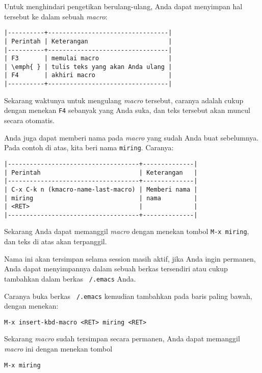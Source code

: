 \documentclass{article}
\begin{document}
Untuk menghindari pengetikan berulang-ulang, Anda dapat menyimpan hal tersebut 
ke dalam sebuah \emph{macro}:

\begin{verbatim}
|----------+---------------------------------|
| Perintah | Keterangan                      |
|----------+---------------------------------|
| F3       | memulai macro                   |
| \emph{ } | tulis teks yang akan Anda ulang |
| F4       | akhiri macro                    |
|----------+---------------------------------|
\end{verbatim}

Sekarang waktunya untuk mengulang \emph{macro} tersebut, caranya adalah cukup
dengan menekan \verb=F4= sebanyak yang Anda suka, dan teks tersebut akan
muncul secara otomatis.

Anda juga dapat memberi nama pada \emph{macro} yang sudah Anda buat
sebelumnya. Pada contoh di atas, kita beri nama \texttt{miring}. Caranya:

\begin{verbatim}
|------------------------------------+--------------|
| Perintah                           | Keterangan   |
|------------------------------------+--------------|
| C-x C-k n (kmacro-name-last-macro) | Memberi nama |
| miring                             | nama         |
| <RET>                              |              |
|------------------------------------+--------------|
\end{verbatim}

Sekarang Anda dapat memanggil \emph{macro} dengan menekan tombol
\texttt{M-x miring}, dan teks di atas akan terpanggil.

Nama ini akan tersimpan selama session masih aktif, jika Anda ingin
permanen, Anda dapat menyimpannya dalam sebuah berkas tersendiri atau
cukup tambahkan dalam berkas \texttt{~/.emacs} Anda.

Caranya buka berkas \texttt{~/.emacs} kemudian tambahkan pada baris
paling bawah, dengan menekan:

\begin{verbatim}
M-x insert-kbd-macro <RET> miring <RET>
\end{verbatim}

Sekarang \emph{macro} sudah tersimpan secara permanen, Anda dapat
memanggil \emph{macro} ini dengan menekan tombol

\begin{verbatim}
M-x miring
\end{verbatim}
\end{document}
